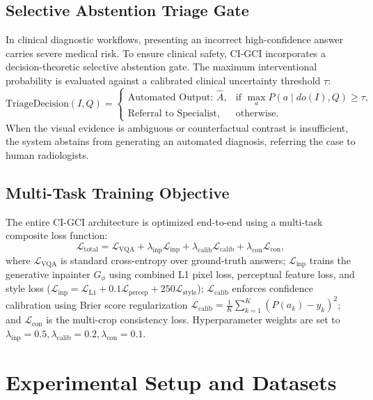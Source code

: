 \documentclass[journal,twoside,web]{ieeecolor}
\begin{document}
\subsection{Selective Abstention Triage Gate}
In clinical diagnostic workflows, presenting an incorrect high-confidence answer carries severe medical risk. To ensure clinical safety, CI-GCI incorporates a decision-theoretic selective abstention gate. The maximum interventional probability is evaluated against a calibrated clinical uncertainty threshold $\tau$:
\begin{equation}
\text{TriageDecision}(I, Q) = \begin{cases} 
\text{Automated Output: } \hat{A}, & \text{if } \max\limits_{a} P(a \mid do(I), Q) \ge \tau, \\[4pt]
\text{Referral to Specialist}, & \text{otherwise.}
\end{cases}
\label{eq:abstain}
\end{equation}
When the visual evidence is ambiguous or counterfactual contrast is insufficient, the system abstains from generating an automated diagnosis, referring the case to human radiologists.

\subsection{Multi-Task Training Objective}
The entire CI-GCI architecture is optimized end-to-end using a multi-task composite loss function:
\begin{equation}
\mathcal{L}_{\text{total}} = \mathcal{L}_{\text{VQA}} + \lambda_{\text{inp}} \mathcal{L}_{\text{inp}} + \lambda_{\text{calib}} \mathcal{L}_{\text{calib}} + \lambda_{\text{con}} \mathcal{L}_{\text{con}},
\label{eq:total_loss}
\end{equation}
where $\mathcal{L}_{\text{VQA}}$ is standard cross-entropy over ground-truth answers; $\mathcal{L}_{\text{inp}}$ trains the generative inpainter $G_{\phi}$ using combined L1 pixel loss, perceptual feature loss, and style loss ($\mathcal{L}_{\text{inp}} = \mathcal{L}_{\text{L1}} + 0.1 \mathcal{L}_{\text{percep}} + 250 \mathcal{L}_{\text{style}}$); $\mathcal{L}_{\text{calib}}$ enforces confidence calibration using Brier score regularization $\mathcal{L}_{\text{calib}} = \frac{1}{K} \sum_{k=1}^K (P(a_k) - y_k)^2$; and $\mathcal{L}_{\text{con}}$ is the multi-crop consistency loss. Hyperparameter weights are set to $\lambda_{\text{inp}}=0.5, \lambda_{\text{calib}}=0.2, \lambda_{\text{con}}=0.1$.

\section{Experimental Setup and Datasets}
\label{sec:datasets}
\end{document}
